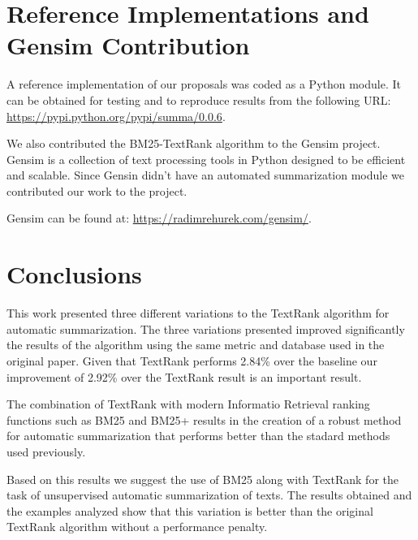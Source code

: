 \documentclass{llncs}
\begin{document}
\section{Reference Implementations and Gensim Contribution}
A reference implementation of our proposals was coded as a Python module. It can be obtained for testing and to reproduce results from the following URL: \url{https://pypi.python.org/pypi/summa/0.0.6}.

We also contributed the BM25-TextRank algorithm to the Gensim project. Gensim is a collection of text processing tools in Python designed to be efficient and scalable. Since Gensin didn't have an automated summarization module we contributed our work to the project. 

Gensim can be found at: \url{https://radimrehurek.com/gensim/}.

\section{Conclusions}
This work presented three different variations to the TextRank algorithm for automatic summarization. The three variations presented improved significantly the results of the algorithm using the same metric and database used in the original paper. Given that TextRank performs 2.84\% over the baseline our improvement of 2.92\% over the TextRank result is an important result. 

The combination of TextRank with modern Informatio Retrieval ranking functions such as BM25 and BM25+ results in the creation of a robust method for automatic summarization that performs better than the stadard methods used previously. 

Based on this results we suggest the use of BM25 along with TextRank for the task of unsupervised automatic summarization of texts. The results obtained and the examples analyzed show that this variation is better than the original TextRank algorithm without a performance penalty.
{}

\end{document}
